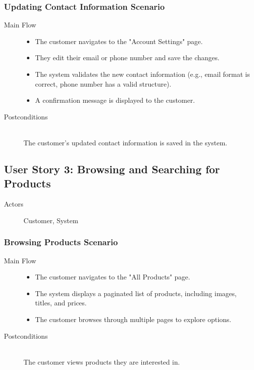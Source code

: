 \documentclass[a4paper,journal]{IEEEtran}
\begin{document}
\subsubsection{Updating Contact Information Scenario}
\begin{description}
  \item[Main Flow] \hfill
    \begin{itemize}
      \item The customer navigates to the "Account Settings" page.
      \item They edit their email or phone number and save the changes.
      \item The system validates the new contact information (e.g., email format
        is correct, phone number has a valid structure).
      \item A confirmation message is displayed to the customer.
    \end{itemize}
  \item[Postconditions] \hfill \\
    The customer's updated contact information is saved in the system.
\end{description}
\subsection{User Story 3: Browsing and Searching for Products}
\begin{description}
  \item[Actors] Customer, System
\end{description}
\subsubsection{Browsing Products Scenario}
\begin{description}
  \item[Main Flow] \hfill
    \begin{itemize}
      \item The customer navigates to the "All Products" page.
      \item The system displays a paginated list of products,
        including images, titles, and prices.
      \item The customer browses through multiple pages to explore options.
    \end{itemize}
  \item[Postconditions] \hfill \\
    The customer views products they are interested in.
\end{description}
\end{document}
